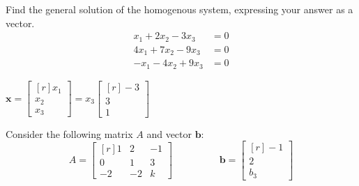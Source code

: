 \documentclass[11pt,noanswers]{exam} %
\renewcommand{\vec}[1]{\mathbf{#1}}
\newcommand{\mat}[1]{\begin{bmatrix*}[r] #1 \end{bmatrix*}}
\begin{document}
\begin{questions}
\begin{solution}
    \end{solution}

    \question Find the general solution of the homogenous system, expressing your answer as a vector.
    \begin{align*}
        x_1 + 2x_2 - 3x_3 &= 0 \\
        4x_1 + 7x_2 - 9x_3 & = 0\\
        -x_1 -4x_2 + 9x_3 &= 0
    \end{align*}
    \begin{solution}
        $\vec{x} = \mat{x_1 \\ x_2 \\ x_3} = x_3 \mat{-3 \\ 3 \\ 1}$
    \end{solution}

        \question Consider the following matrix $A$ and vector $\vec{b}$:
        \begin{equation*}
            A = \mat{1 & 2 & -1 \\ 0 & 1 & 3 \\ -2 & -2 & k} \hspace{2cm} \vec{b} = \mat{-1 \\ 2 \\ b_3}
        \end{equation*}
        \begin{solution}
\end{solution}
\end{questions}
\end{document}
